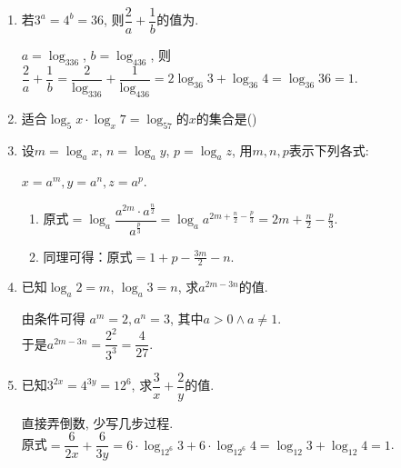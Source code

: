 \begin{enumerate}
\item 若$3^a=4^b=36$, 则$\dfrac{2}{a}+\dfrac{1}{b}$的值为. 
\begin{jieda}
$a=\log_336$, $b=\log_436$, 则$\dfrac{2}{a}+\dfrac{1}{b}=\dfrac{2}{\log_336}+\dfrac{1}{\log_436}=2\log_{36}3+\log_{36}4=\log_{36}36=1$. 
\end{jieda}


\item 适合$\log_5x\cdot\log_x7=\log_57$的$x$的集合是\dotfill()


\item 设$m=\log_ax$, $n=\log_ay$, $p=\log_az$, 用$m,n,p$表示下列各式: \\
\begin{jieda}
$x=a^m,y=a^n,z=a^p$. 
\begin{enumerate}[(1)]
\item 原式$=\log_a\dfrac{a^{2m}\cdot a^{\frac{n}{2}}}{a^{\frac{p}{3}}}=\log_aa^{2m+\frac{n}{2}-\frac{p}{3}}=2m+\frac{n}{2}-\frac{p}{3}$. 
\item 同理可得：原式$=1+p-\frac{3m}{2}-n$. 
\end{enumerate}
\end{jieda}

\begin{vspace_}
    \vsp[3]
\end{vspace_}


\item 已知$\log_a2=m$, $\log_a3=n$, 求$a^{2m-3n}$的值. 
\begin{jieda}
由条件可得 $a^m=2, a^n=3$, 其中$a>0\land a\neq 1$. \\
于是$a^{2m-3n}=\dfrac{2^2}{3^3}=\dfrac{4}{27}$. 
\end{jieda}
\begin{vspace_}
    \vsp[3]
\end{vspace_}

\item 已知$3^{2x}=4^{3y}=12^6$, 求$\dfrac{3}{x}+\dfrac{2}{y}$的值. 
\begin{jieda}
直接弄倒数, 少写几步过程. \\
原式$=\dfrac{6}{2x}+\dfrac{6}{3y}=6\cdot\log_{12^6}3+6\cdot\log_{12^6}4=\log_{12}3+\log_{12}4=1$. 
\end{jieda}


\end{enumerate}
